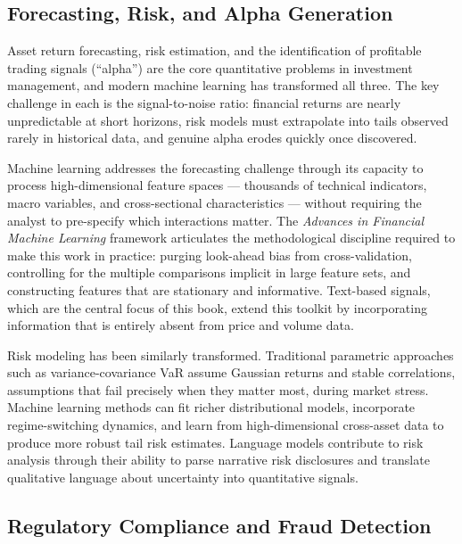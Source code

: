 \subsection{Forecasting, Risk, and Alpha Generation}
\label{subsec:forecasting-risk-alpha}

Asset return forecasting, risk estimation, and the identification of
profitable trading signals (``alpha'') are the core quantitative problems
in investment management, and modern machine learning has transformed all
three.  The key challenge in each is the signal-to-noise ratio:
financial returns are nearly unpredictable at short horizons, risk models
must extrapolate into tails observed rarely in historical data, and genuine
alpha erodes quickly once discovered.

Machine learning addresses the forecasting challenge through its capacity
to process high-dimensional feature spaces --- thousands of technical
indicators, macro variables, and cross-sectional characteristics --- without
requiring the analyst to pre-specify which interactions matter.  The
\emph{Advances in Financial Machine Learning} framework
\parencite{lopezdeprado2018advances} articulates the methodological
discipline required to make this work in practice: purging look-ahead
bias from cross-validation, controlling for the multiple comparisons
implicit in large feature sets, and constructing features that are
stationary and informative.  Text-based signals, which are the central
focus of this book, extend this toolkit by incorporating information that
is entirely absent from price and volume data.

Risk modeling has been similarly transformed.  Traditional parametric
approaches such as variance-covariance VaR assume Gaussian returns and
stable correlations, assumptions that fail precisely when they matter
most, during market stress.  Machine learning methods can fit richer
distributional models, incorporate regime-switching dynamics, and learn
from high-dimensional cross-asset data to produce more robust tail risk
estimates.  Language models contribute to risk analysis through their
ability to parse narrative risk disclosures and translate qualitative
language about uncertainty into quantitative signals.

\subsection{Regulatory Compliance and Fraud Detection}
\label{subsec:compliance-fraud}

